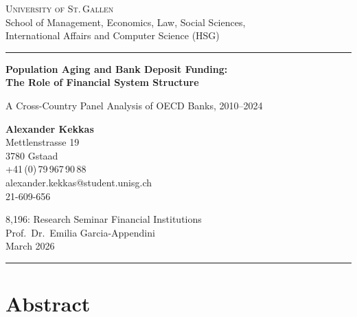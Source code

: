 \documentclass[12pt,a4paper]{article}
\begin{document}

\thispagestyle{empty}
\begin{center}

\vspace*{1cm}

{\large\textsc{University of St.\,Gallen}}\\[0.3cm]
{\normalsize School of Management, Economics, Law, Social Sciences,\\ International Affairs and Computer Science (HSG)}

\vspace{0.5cm}
\noindent\rule{\textwidth}{0.4pt}

\vspace{2cm}

{\LARGE\bfseries Population Aging and Bank Deposit Funding:\\[0.4cm] The Role of Financial System Structure}

\vspace{0.8cm}

{\large A Cross-Country Panel Analysis of OECD Banks, 2010--2024}

\vspace{3cm}

{\large\textbf{Alexander Kekkas}}\\[0.3cm]
Mettlenstrasse 19\\
3780 Gstaad\\
+41\,(0)\,79\,967\,90\,88\\
alexander.kekkas@student.unisg.ch\\
21-609-656

\vspace{2cm}

8,196: Research Seminar Financial Institutions\\
Prof.\ Dr.\ Emilia Garcia-Appendini\\[0.3cm]
March 2026

\vspace{1cm}
\noindent\rule{\textwidth}{0.4pt}

\end{center}

\newpage


\thispagestyle{fancy}
\section*{Abstract}
\end{document}
